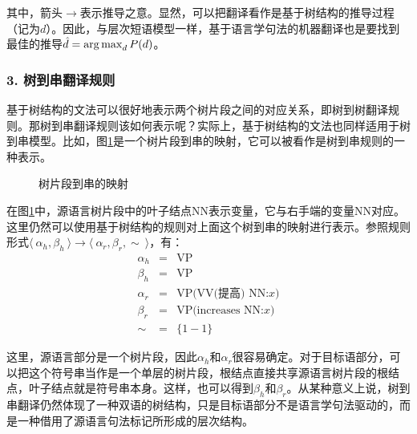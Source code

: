 \noindent 其中，箭头$\rightarrow$表示推导之意。显然，可以把翻译看作是基于树结构的推导过程（记为$d$）。因此，与层次短语模型一样，基于语言学句法的机器翻译也是要找到最佳的推导$\hat{d} = \operatorname*{arg\,max}_{d} {P} (d)$。


\subsubsection{3. 树到串翻译规则}

\parinterval 基于树结构的文法可以很好地表示两个树片段之间的对应关系，即树到树翻译规则。那树到串翻译规则该如何表示呢？实际上，基于树结构的文法也同样适用于树到串模型。比如，图\ref{fig:8-22}是一个树片段到串的映射，它可以被看作是树到串规则的一种表示。

\begin{figure}[htp]
\centering

\caption{树片段到串的映射}
\label{fig:8-22}
\end{figure}

\parinterval 在图\ref{fig:8-22}中，源语言树片段中的叶子结点NN表示变量，它与右手端的变量NN对应。这里仍然可以使用基于树结构的规则对上面这个树到串的映射进行表示。参照规则形式$\langle\  \alpha_h, \beta_h\ \rangle \to \langle\ \alpha_r, \beta_r, \sim\ \rangle$，有：
\begin{eqnarray}
\alpha_h & = & \textrm{VP} \nonumber \\
\beta_h & = & \textrm{VP} \nonumber \\
\alpha_r & = & \textrm{VP(VV(提高)\ \ NN:}x) \nonumber \\
\beta_r & = & \textrm{VP(increases\ \ NN:}x) \nonumber \\
\sim & = & \{1-1\} \nonumber
\end{eqnarray}

\parinterval 这里，源语言部分是一个树片段，因此$\alpha_h$和$\alpha_r$很容易确定。对于目标语部分，可以把这个符号串当作是一个单层的树片段，根结点直接共享源语言树片段的根结点，叶子结点就是符号串本身。这样，也可以得到$\beta_h$和$\beta_r$。从某种意义上说，树到串翻译仍然体现了一种双语的树结构，只是目标语部分不是语言学句法驱动的，而是一种借用了源语言句法标记所形成的层次结构。

